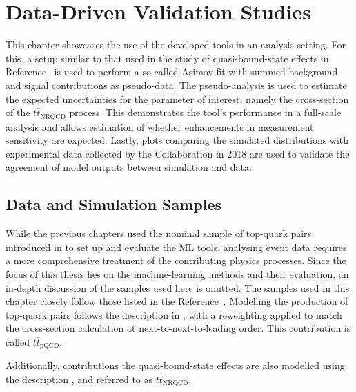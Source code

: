 \chapter{Data-Driven Validation Studies}
\label{chap:physics-analysis}
This chapter showcases the use of the developed tools in an analysis setting. For this, a setup similar to that used in the study of quasi-bound-state effects in Reference~\cite{atlas_toponium} is used to perform a so-called Asimov fit with summed background and signal contributions as pseudo-data. The pseudo-analysis is used to estimate the expected uncertainties for the parameter of interest, namely the cross-section of the ${t\bar{t}}_{\text{NRQCD}}$ process. This demonstrates the tool's performance in a full-scale analysis and allows estimation of whether enhancements in measurement sensitivity are expected. Lastly, plots comparing the simulated distributions with experimental data collected by the \atlas Collaboration in 2018 are used to validate the agreement of model outputs between simulation and data.

\section{Data and Simulation Samples}
\label{sec:samples}
While the previous chapters used the nominal sample of top-quark pairs introduced in  to set up and evaluate the ML tools, analysing event data requires a more comprehensive treatment of the contributing physics processes.
Since the focus of this thesis lies on the machine-learning methods and their evaluation, an in-depth discussion of the samples used here is omitted. The samples used in this chapter closely follow those listed in the Reference~\cite{atlas_toponium}.
Modelling the production of top-quark pairs follows the description in , with a reweighting applied to match the cross-section calculation at next-to-next-to-leading order.
This contribution is called ${t\bar{t}}_{\text{pQCD}}$.

Additionally, contributions the quasi-bound-state effects are also modelled using the description , and referred to as ${t\bar{t}}_{\text{NRQCD}}$.

